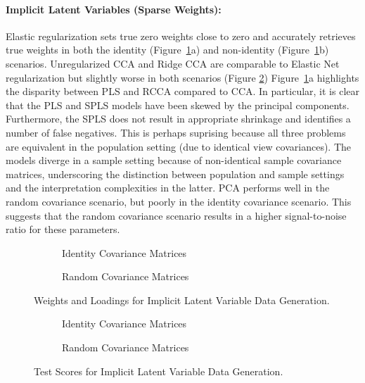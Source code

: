\paragraph{Implicit Latent Variables (Sparse Weights):} Elastic regularization sets true zero weights close to zero and accurately retrieves true weights in both the identity (Figure~\ref{fig:joint-identity-weights-loadings}a) and non-identity (Figure~\ref{fig:joint-identity-weights-loadings}b) scenarios.
Unregularized CCA and Ridge CCA are comparable to Elastic Net regularization but slightly worse in both scenarios (Figure \ref{fig:joint-scores})
Figure~\ref{fig:joint-identity-weights-loadings}a highlights the disparity between PLS and RCCA compared to CCA.
In particular, it is clear that the PLS and SPLS models have been skewed by the principal components.
Furthermore, the SPLS does not result in appropriate shrinkage and identifies a number of false negatives.
This is perhaps suprising because all three problems are equivalent in the population setting (due to identical view covariances).
The models diverge in a sample setting because of non-identical sample covariance matrices, underscoring the distinction between population and sample settings and the interpretation complexities in the latter.
PCA performs well in the random covariance scenario, but poorly in the identity covariance scenario.
This suggests that the random covariance scenario results in a higher signal-to-noise ratio for these parameters.

\begin{figure}
\centering
\begin{subfigure}{0.49\linewidth}
\centering

\caption{Identity Covariance Matrices}
\end{subfigure}
%
\begin{subfigure}{0.49\linewidth}
\centering

\caption{Random Covariance Matrices}
\end{subfigure}
\caption{Weights and Loadings for Implicit Latent Variable Data Generation.}\label{fig:joint-identity-weights-loadings}
\end{figure}

\begin{figure}
\centering
\begin{subfigure}{0.49\linewidth}
\centering

\caption{Identity Covariance Matrices}
\end{subfigure}
%
\begin{subfigure}{0.49\linewidth}
\centering

\caption{Random Covariance Matrices}
\end{subfigure}
\caption{Test Scores for Implicit Latent Variable Data Generation.}\label{fig:joint-scores}
\end{figure}

